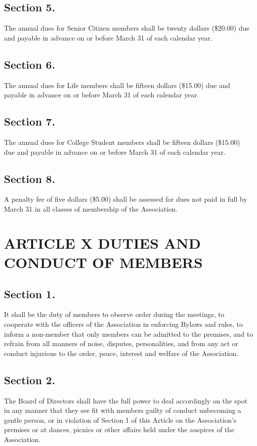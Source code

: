 \documentclass[12pt,letterpaper]{article}
\begin{document}
\subsection*{Section 5.} The annual dues for Senior Citizen members shall be twenty dollars (\$20.00)
due and payable in advance on or before March 31 of each calendar year.
\subsection*{Section 6.} The annual dues for Life members shall be fifteen dollars (\$15.00) due and
payable in advance on or before March 31 of each calendar year.
\subsection*{Section 7.} The annual dues for College Student members shall be fifteen dollars
(\$15.00) due and payable in advance on or before March 31 of each calendar year.
\subsection*{Section 8.} A penalty fee of five dollars (\$5.00) shall be assessed for dues not paid in
full by March 31 in all classes of membership of the Association.

\section*{ARTICLE X
DUTIES AND CONDUCT OF MEMBERS}

\subsection*{Section 1.} It shall be the duty of members to observe order during the meetings, to
cooperate with the officers of the Association in enforcing Bylaws and rules, to inform a
non-member that only members can be admitted to the premises, and to refrain from all
manners of noise, disputes, personalities, and from any act or conduct injurious to the
order, peace, interest and welfare of the Association.
\subsection*{Section 2.} The Board of Directors shall have the full power to deal accordingly on the
spot in any manner that they see fit with members guilty of conduct unbecoming a
gentle person, or in violation of Section 1 of this Article on the Association’s premises or
at dances, picnics or other affairs held under the auspices of the Association.
\end{document}
